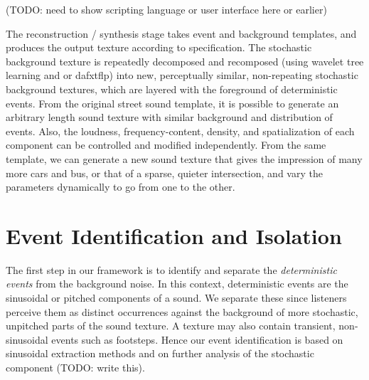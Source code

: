 \documentclass{acmsiggraph}               %
\begin{document}
(TODO: need to show scripting language or user interface here or earlier)

The reconstruction / synthesis stage takes event and background templates,
and produces the output texture according to specification.
The stochastic background texture is repeatedly decomposed and 
recomposed (using wavelet tree learning and or dafxtflp) into new,
perceptually similar, non-repeating stochastic background textures, 
which are layered with the foreground of deterministic events.  From the 
original street sound template, it is possible to generate an arbitrary length 
sound texture with similar background and distribution of events.  Also, the 
loudness, frequency-content, density, and spatialization of each 
component can be controlled and modified independently.  From the same 
template, we can generate a new sound texture that gives the impression 
of many more cars and bus, or that of a sparse, quieter intersection, and 
vary the parameters dynamically to go from one to the other.






\section{Event Identification and Isolation}

The first step in our framework is to identify and separate the \textit{deterministic events}
from the background noise. In this context, deterministic events are the sinusoidal or pitched 
components of a sound. We separate these since listeners perceive them as distinct 
occurrences against the background of more stochastic, unpitched parts of 
the sound texture. A texture may also contain transient, non-sinusoidal events such as footsteps. Hence our event identification is based on sinusoidal 
extraction methods and on further analysis of the stochastic component (TODO: write this). 
\end{document}
